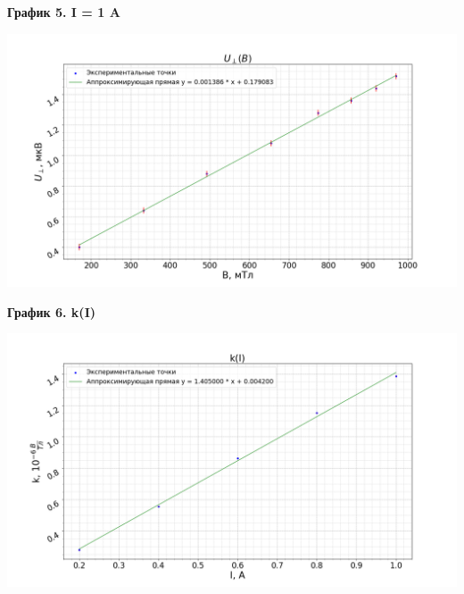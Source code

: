 \documentclass[15pt,a5paper,reqno]{article}
\begin{document}
    \noindent\hypertarget{graph_5}{\textbf{График 5. I = 1 A}}
    \begin{center}
        \includegraphics[width = \textwidth]{images/graph_5.png}
    \end{center}

    \noindent\hypertarget{graph_6}{\textbf{График 6. k(I)}}
    \begin{center}
        \includegraphics[width = \textwidth]{images/graph_6.png}
    \end{center}
\end{document}

